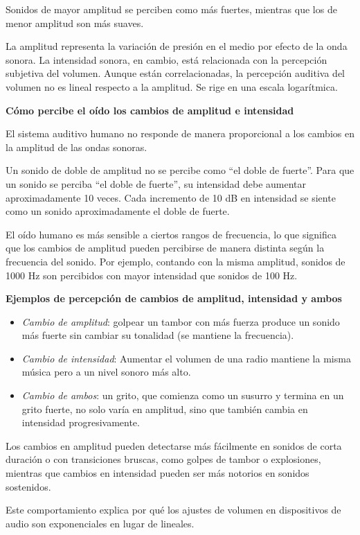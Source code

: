 Sonidos de mayor amplitud se perciben como más fuertes, mientras que los de menor amplitud son más suaves.

\begin{tcolorbox}[title=Relación entre Amplitud e Intensidad,colback=gray!10, colframe=gray!50, sharp corners=south]
La amplitud representa la variación de presión en el medio por efecto de la onda sonora. La intensidad sonora, en cambio, está relacionada con la percepción subjetiva del volumen. Aunque están correlacionadas, la percepción auditiva del volumen no es lineal respecto a la amplitud. Se rige en una escala logarítmica.\vspace{10pt}

\parbox{\textwidth}{\textbf{Cómo percibe el oído los cambios de amplitud e intensidad}}
El sistema auditivo humano no responde de manera proporcional a los cambios en la amplitud de las ondas sonoras.

Un sonido de doble de amplitud no se percibe como ``el doble de fuerte''. Para que un sonido se perciba ``el doble de fuerte'', su intensidad debe aumentar aproximadamente 10 veces. Cada incremento de 10 dB en intensidad se siente como un sonido aproximadamente el doble de fuerte.

El oído humano es más sensible a ciertos rangos de frecuencia, lo que significa que los cambios de amplitud pueden percibirse de manera distinta según la frecuencia del sonido. Por ejemplo, contando con la misma amplitud, sonidos de 1000 Hz son percibidos con mayor intensidad que sonidos de 100 Hz.\vspace{10pt}

\parbox{\textwidth}{\textbf{Ejemplos de percepción de cambios de amplitud, intensidad y ambos}}
\begin{itemize}
    \item \emph{Cambio de amplitud}: golpear un tambor con más fuerza produce un sonido más fuerte sin cambiar su tonalidad (se mantiene la frecuencia).
    \item \emph{Cambio de intensidad}: Aumentar el volumen de una radio mantiene la misma música pero a un nivel sonoro más alto.
    \item \emph{Cambio de ambos}: un grito, que comienza como un susurro y termina en un grito fuerte, no solo varía en amplitud, sino que también cambia en intensidad progresivamente.
\end{itemize}

Los cambios en amplitud pueden detectarse más fácilmente en sonidos de corta duración o con transiciones bruscas, como golpes de tambor o explosiones, mientras que cambios en intensidad pueden ser más notorios en sonidos sostenidos.

Este comportamiento explica por qué los ajustes de volumen en dispositivos de audio son exponenciales en lugar de lineales.
\end{tcolorbox}

